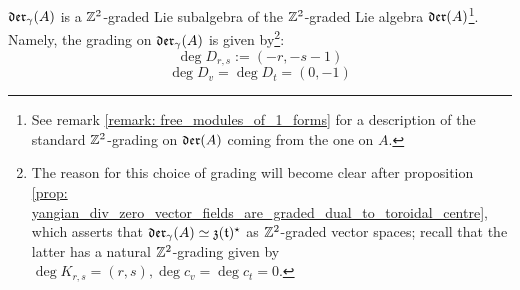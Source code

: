         \begin{corollary} \label{coro: yangian_div_zero_vector_fields_are_graded}
            $\mathfrak{der}_{\gamma}(A)$ is a $\mathbb{Z}^2$-graded Lie subalgebra of the $\mathbb{Z}^2$-graded Lie algebra $\mathfrak{der}(A)$\footnote{See remark \ref{remark: free_modules_of_1_forms} for a description of the standard $\mathbb{Z}^2$-grading on $\mathfrak{der}(A)$ coming from the one on $A$.}. Namely, the grading on $\mathfrak{der}_{\gamma}(A)$ is given by\footnote{The reason for this choice of grading will become clear after proposition \ref{prop: yangian_div_zero_vector_fields_are_graded_dual_to_toroidal_centre}, which asserts that $\mathfrak{der}_{\gamma}(A) \simeq \mathfrak{z}(\mathfrak{t})^{\star}$ as $\mathbb{Z}^2$-graded vector spaces; recall that the latter has a natural $\mathbb{Z}^2$-grading given by $\deg K_{r, s} = (r, s), \deg c_v = \deg c_t = 0$.}:
                $$\deg D_{r, s} := (-r, -s - 1)$$
                $$\deg D_v = \deg D_t = (0, -1)$$
        \end{corollary}

